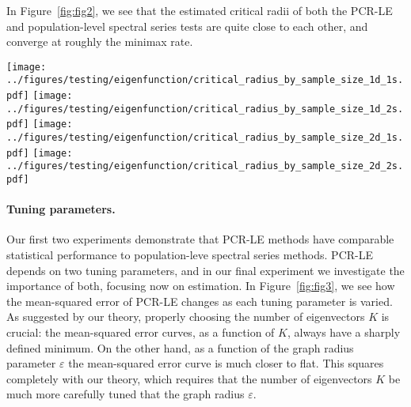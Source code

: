 In Figure~\ref{fig:fig2}, we see that the estimated critical radii of both the PCR-LE and population-level spectral series tests are quite close to each other, and converge at roughly the minimax rate.
\begin{figure*}[b]
	\texttt{[image: ../figures/testing/eigenfunction/critical\_radius\_by\_sample\_size\_1d\_1s.pdf]}
	\texttt{[image: ../figures/testing/eigenfunction/critical\_radius\_by\_sample\_size\_1d\_2s.pdf]}
	\texttt{[image: ../figures/testing/eigenfunction/critical\_radius\_by\_sample\_size\_2d\_1s.pdf]}
	\texttt{[image: ../figures/testing/eigenfunction/critical\_radius\_by\_sample\_size\_2d\_2s.pdf]}
	\caption{Worst-case testing risk for PCR-LE (\texttt{LE}) and spectral series (\texttt{SP}) tests, as a function of sample size $n$. Plots are on the same scale as Figure~\ref{fig:fig1}, and black line shows the minimax rate. All tests are set to have $.05$ Type I error, and are calibrated by simulation under the null.}
	\label{fig:fig2}
\end{figure*}

\paragraph{Tuning parameters.}
Our first two experiments demonstrate that PCR-LE methods have comparable statistical performance to population-leve spectral series methods. PCR-LE depends on two tuning parameters, and in our final experiment we investigate the importance of both, focusing now on estimation. In Figure~\ref{fig:fig3}, we see how the mean-squared error of PCR-LE changes as each tuning parameter is varied. As suggested by our theory, properly choosing the number of eigenvectors $K$ is crucial: the mean-squared error curves, as a function of $K$, always have a sharply defined minimum. On the other hand, as a function of the graph radius parameter $\varepsilon$ the mean-squared error curve is much closer to flat. This squares completely with our theory, which requires that the number of eigenvectors $K$ be much more carefully tuned that the graph radius $\varepsilon$.

